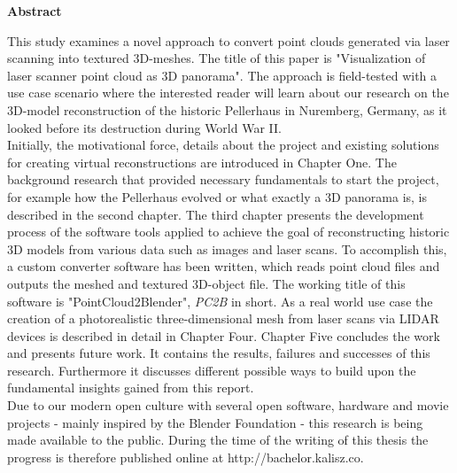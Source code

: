 \thispagestyle{plain}
\begin{center}
	
	\LARGE
	\textbf{Abstract}
	
\end{center}
\vspace{100pt}

This study examines a novel approach to convert point clouds generated via laser scanning into textured 3D-meshes. The title of this paper is "Visualization of laser scanner point cloud as 3D panorama".
The approach is field-tested with a use case scenario where the interested reader will learn about our research on the 3D-model reconstruction of the historic Pellerhaus in Nuremberg, Germany, as it looked before its destruction during World War II.\\

Initially, the motivational force, details about the project and existing solutions for creating virtual reconstructions are introduced in Chapter One.
The background research that provided necessary fundamentals to start the project, for example how the Pellerhaus evolved or what exactly a 3D panorama is, is described in the second chapter.
The third chapter presents the development process of the software tools applied to achieve the goal of reconstructing historic 3D models from various data such as images and laser scans. To accomplish this, a custom converter software has been written, which reads point cloud files and outputs the meshed and textured 3D-object file. The working title of this software is "PointCloud2Blender", \textit{PC2B} in short.
As a real world use case the creation of a photorealistic three-dimensional mesh from laser scans via LIDAR devices is described in detail in Chapter Four.
Chapter Five concludes the work and presents future work. It contains the results, failures and successes of this research. Furthermore it discusses different possible ways to build upon the fundamental insights gained from this report.\\

Due to our modern open culture with several open software, hardware and movie projects - mainly inspired by the Blender Foundation - this research is being made available to the public. During the time of the writing of this thesis the progress is therefore published online at http://bachelor.kalisz.co.
